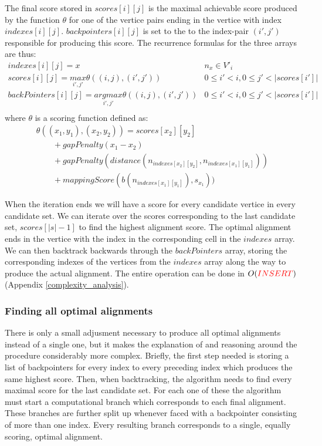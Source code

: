 \documentclass[thesis.tex]{subfiles}
\begin{document}
\par\noindent
The final score stored in $scores[i][j]$ is the maximal achievable score produced by the function $\theta$ for one of the vertice pairs ending in the vertice with index $indexes[i][j]$. $backpointers[i][j]$ is set to the to the index-pair $(i', j')$ responsible for producing this score. The recurrence formulas for the three arrays are thus:\\
\begin{equation}
  \begin{array}{ll}
    indexes[i][j] = x & n_x \in V'_i\\
    scores[i][j] = \underset{i', j'}{max} \theta((i, j), (i', j')) & 0 \leq i' < i, 0 \leq j' < |scores[i']|\\
    backPointers[i][j] = \underset{i', j'}{argmax} \theta((i, j), (i', j')) & 0 \leq i' < i, 0 \leq j' < |scores[i']|\\
  \end{array}
\end{equation}
where $\theta$ is a scoring function defined as:\\
\begin{equation}
  \begin{array}{l}
    \theta((x_1, y_1), (x_2, y_2))=scores[x_2][y_2] \\\quad\quad + gapPenalty(x_1-x_2) \\\quad\quad + gapPenalty(distance(n_{indexes[x_2][y_2]}, n_{indexes[x_1][y_1]})) \\\quad\quad + mappingScore(b(n_{indexes[x_1][y_1]}), s_{x_1}))
  \end{array}
\end{equation}
\par\noindent
When the iteration ends we will have a score for every candidate vertice in every candidate set. We can iterate over the scores corresponding to the last candidate set, $scores[|s|-1]$ to find the highest alignment score. The optimal alignment ends in the vertice with the index in the corresponding cell in the $indexes$ array. We can then backtrack backwards through the $backPointers$ array, storing the corresponding indexes of the vertices from the $indexes$ array along the way to produce the actual alignment. The entire operation can be done in $O(\textcolor{red}{INSERT})$ (Appendix \ref{complexity_analysis}).
\subsubsection{Finding all optimal alignments}
\label{sec:all_optimal_alignments}
There is only a small adjusment necessary to produce all optimal alignments instead of a single one, but it makes the explanation of and reasoning around the procedure considerably more complex. Briefly, the first step needed is storing a list of backpointers for every index to every preceding index which produces the same highest score. Then, when backtracking, the algorithm needs to find every maximal score for the last candidate set. For each one of these the algorithm must start a computational branch which corresponds to each final alignment. These branches are further split up whenever faced with a backpointer consisting of more than one index. Every resulting branch corresponds to a single, equally scoring, optimal alignment.
\end{document}
